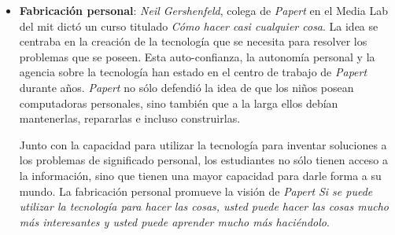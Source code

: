 \begin{itemize}
\item \textbf{Fabricación personal}: \textit{Neil Gershenfeld}, colega de
    \textit{Papert} en el Media Lab del \Gls{mit} dictó un curso titulado
    \emph{Cómo hacer casi cualquier cosa}. La idea se centraba en la creación de
    la tecnología que se necesita para resolver los problemas que se poseen.
    Esta auto-confianza, la autonomía personal y la agencia sobre la tecnología
    han estado en el centro de trabajo de \textit{Papert} durante años.
    \textit{Papert} no sólo defendió la idea de que los niños posean
    computadoras personales, sino también que a la larga ellos debían
    mantenerlas, repararlas e incluso construirlas.

    Junto con la capacidad para utilizar la tecnología para inventar soluciones
    a los problemas de significado personal, los estudiantes no sólo tienen
    acceso a la información, sino que tienen una mayor capacidad para darle
    forma a su mundo. La fabricación personal promueve la visión de
    \textit{Papert} \emph{Si se puede utilizar la tecnología para hacer las
        cosas, usted puede hacer las cosas mucho más interesantes y usted puede
        aprender mucho más haciéndolo}\cite{papertian:const}.

\end{itemize}



